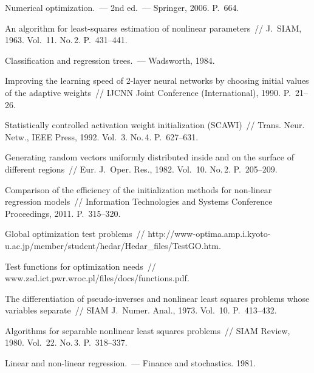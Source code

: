 \begin{multicols}{2}
{{\begin{thebibliography}{99}
Numerical optimization.~--- 2nd ed.~---
  Springer, 2006. P.~664.

  An algorithm for least-squares estimation of nonlinear parameters~//
  J.~SIAM, 1963. Vol.~11. No.\,2. P.~431--441.

  Classification and regression trees.~--- Wadsworth, 1984.

  Improving the learning speed of 2-layer neural networks by choosing
      initial values of the adaptive weights~//
  IJCNN  Joint Conference (International), 1990. P.~21--26.

  Statistically controlled activation weight initialization (SCAWI)~//
  Trans. Neur. Netw., IEEE Press, 1992. Vol.~3. No.\,4. P.~627--631.

  Generating random vectors uniformly distributed inside and on the surface of different regions~//
  Eur. J.~Oper. Res., 1982. Vol.~10. No.\,2. P.~205--209.
  
  Comparison of the efficiency of the initialization methods for non-linear regression models~//
  Information Technologies and Systems Conference Proceedings, 2011. P.~315--320.

    Global optimization test problems~//
    {\sf http://www-optima.amp.i.kyoto-u.ac.jp/member/\linebreak student/hedar/Hedar\_files/TestGO.htm}.

    {Test functions for optimization needs}~//
    {\sf www.zsd.ict.pwr.wroc.pl/files/docs/\linebreak functions.pdf}.


  The differentiation of pseudo-inverses and nonlinear least squares
  problems whose variables separate~//
  SIAM J.~Numer. Anal., 1973. Vol.~10. P.~413--432.

  Algorithms for separable nonlinear least squares problems~//
  SIAM Review, 1980. Vol.~22. No.\,3. P.~318--337.

  Linear and non-linear regression.~---
  Finance and stochastics. 1981.


\end{thebibliography}}}
\end{multicols}
